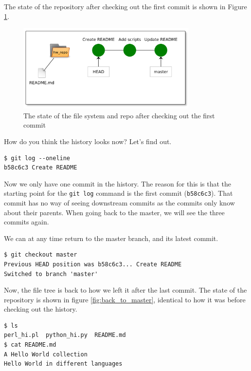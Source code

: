 \documentclass[../main/git_course_main.tex]{subfiles}
\begin{document}
The state of the repository after checking out the first commit is shown in Figure \ref{fig:checkout}.

\begin{figure}[h]
	\centering
	\includegraphics[width=0.8\textwidth]{../visualizations/chapter3/c31_repo_checkout_commit.pdf}
	\caption{The state of the file system and repo after checking out the first commit}
	\label{fig:checkout}
\end{figure}

How do you think the history looks now? Let's find out.

\begin{codebox}
\begin{lstlisting}
$ git log --oneline
b58c6c3 Create README
\end{lstlisting}
\end{codebox}

Now we only have one commit in the history. The reason for this is that the starting point
for the \verb$git log$ command is the first commit (\verb$b58c6c3$). That commit has no way
of seeing downstream commits as the commits only know about their parents. When going back to the master, we will see the three commits again.

We can at any time return to the master branch, and its latest commit.

\begin{codebox}
\begin{lstlisting}
$ git checkout master
Previous HEAD position was b58c6c3... Create README
Switched to branch 'master'
\end{lstlisting}
\end{codebox}

Now, the file tree is back to how we left it after the last commit. The state of the repository is shown in figure \ref{fig:back_to_master}, identical to how it was before checking out the history.

\begin{codebox}
\begin{lstlisting}
$ ls
perl_hi.pl  python_hi.py  README.md
$ cat README.md
A Hello World collection
Hello World in different languages
\end{lstlisting}
\end{codebox}
\end{document}
